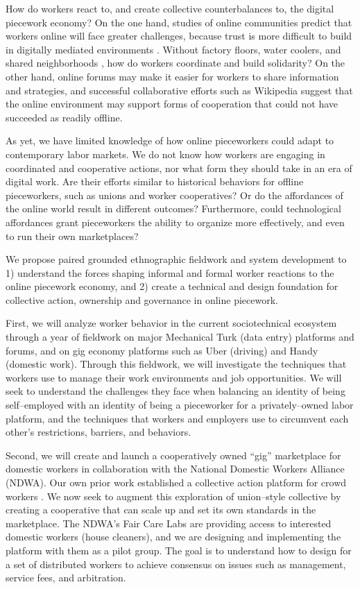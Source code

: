 \documentclass[11pt]{article}
\begin{document}
How do workers react to, and create collective counterbalances to, the digital piecework economy?
On the one hand, studies of online communities predict that workers online will face greater challenges, because trust is more difficult to build in digitally mediated environments
\cite{successfulOnlineCommunities,kollock2005managing,cook2005cooperation}.
Without factory floors, water coolers, and shared neighborhoods
\cite{waterCooler},
how do workers coordinate and build solidarity?
On the other hand,
online forums may make it easier for workers to share information and strategies,
and successful collaborative efforts such as Wikipedia suggest that the online environment may support forms of cooperation that could not have succeeded as readily offline.

As yet,
we have limited knowledge of how online pieceworkers could adapt to contemporary labor markets.
We do not know how workers are engaging in coordinated and cooperative actions,
nor what form they should take in an era of digital work.
Are their efforts similar to historical behaviors for offline pieceworkers,
such as unions and worker cooperatives?
Or do the affordances of the online world result in different outcomes?
Furthermore,
could technological affordances grant pieceworkers the ability to organize more effectively,
and even to run their own marketplaces?

We propose paired grounded ethnographic fieldwork and system development to 1) understand the forces shaping informal and formal worker reactions to the online piecework economy,
and 2) create a technical and design foundation for collective action,
ownership and governance in online piecework.


First, we will analyze worker behavior in the current sociotechnical ecosystem through a year of fieldwork on major Mechanical Turk
(data entry)
platforms and forums,
and on gig economy platforms such as Uber
(driving)
and Handy
(domestic work).
Through this fieldwork, we will investigate the techniques that workers use to manage their work environments and job opportunities.
We will seek to understand the challenges they face when balancing an identity of being self--employed with an identity of being a pieceworker for a privately--owned labor platform, and the techniques that workers and employers use to circumvent each other's restrictions, barriers, and behaviors.

Second, we will create and launch a cooperatively owned ``gig'' marketplace for domestic workers in collaboration with the National Domestic Workers Alliance
(NDWA).
Our own prior work established a collective action platform for crowd workers
\cite{dynamo}.
We now seek to augment this exploration of union--style collective by creating a cooperative that can scale up and set its own standards in the marketplace.
The NDWA's Fair Care Labs are providing access to interested domestic workers
(house cleaners), and we are designing and implementing the platform with them as a pilot group.
The goal is to understand how to design for a set of distributed workers to achieve consensus on issues such as management, service fees, and arbitration.
\end{document}
